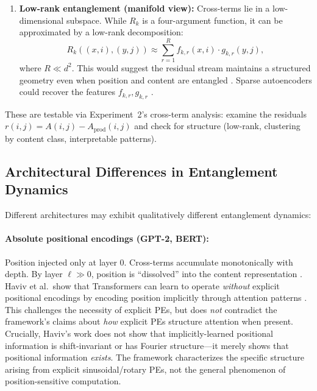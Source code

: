 \documentclass[11pt]{article}
\theoremstyle{definition}
\begin{document}
\begin{enumerate}
    \item \textbf{Low-rank entanglement (manifold view):} Cross-terms lie in a low-dimensional subspace. While $R_k$ is a four-argument function, it can be approximated by a low-rank decomposition:
    \[
    R_k((x,i),(y,j)) \approx \sum_{r=1}^R f_{k,r}(x,i) \cdot g_{k,r}(y,j),
    \]
    where $R \ll d^2$. This would suggest the residual stream maintains a structured geometry even when position and content are entangled \cite{park2024geometry,cunningham2024dictlearning}. Sparse autoencoders could recover the features $f_{k,r}, g_{k,r}$ \cite{bricken2023monosemanticity,templeton2024sae}.
\end{enumerate}

These are testable via Experiment~2's cross-term analysis: examine the residuals $r(i,j) = A(i,j) - A_{\text{prod}}(i,j)$ and check for structure (low-rank, clustering by content class, interpretable patterns).

\subsection{Architectural Differences in Entanglement Dynamics}

Different architectures may exhibit qualitatively different entanglement dynamics:

\paragraph{Absolute positional encodings (GPT-2, BERT):}
Position injected only at layer 0. Cross-terms accumulate monotonically with depth. By layer $\ell \gg 0$, position is ``dissolved'' into the content representation \cite{haviv2022nopos}. Haviv et al.\ show that Transformers can learn to operate \emph{without} explicit positional encodings by encoding position implicitly through attention patterns \cite{haviv2022nopos,kazemnejad2024lengthgen}. This challenges the necessity of explicit PEs, but does \emph{not} contradict the framework's claims about \emph{how} explicit PEs structure attention when present. Crucially, Haviv's work does not show that implicitly-learned positional information is shift-invariant or has Fourier structure---it merely shows that positional information \emph{exists}. The framework characterizes the specific structure arising from explicit sinusoidal/rotary PEs, not the general phenomenon of position-sensitive computation.
\end{document}
